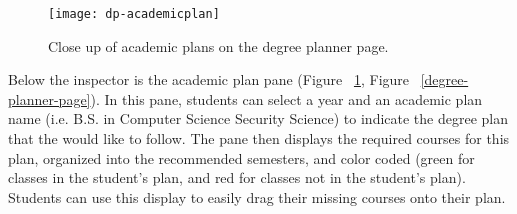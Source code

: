 \begin{figure}[htbp!]
\centering
\texttt{[image: dp-academicplan]}
\caption{Close up of academic plans on the degree planner page.}
\label{academic-plans}
\end{figure}
Below the inspector is the academic plan pane (Figure ~\ref{academic-plans}, Figure ~\ref{degree-planner-page}). In this pane, students can select a year and an academic plan name (i.e. B.S. in Computer Science Security Science) to indicate the degree plan that the would like to follow. The pane then displays the required courses for this plan, organized into the recommended semesters, and color coded (green for classes in the student's plan, and red for classes not in the student's plan). Students can use this display to easily drag their missing courses onto their plan.


